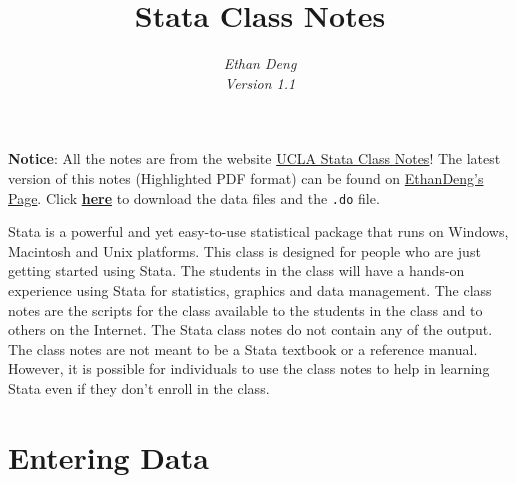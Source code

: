 \documentclass{article}
\title{\bfseries{\color{blue}Stata} {\color{magenta}Class Notes}}
\author{\Large\gara\itshape{{\color{blue}E}than {\color{magenta}D}eng} \\ Version 1.1}
\begin{document}
\maketitle
\noindent\textbf{Notice}: All the notes are from the website \href{http://www.ats.ucla.edu/stat/stata/notes/default13.htm}{UCLA Stata Class Notes}! The latest version of this notes (Highlighted PDF format) can be found on \href{http://ddswhu.com/}{EthanDeng\rq{}s Page}. Click \href{http://stack.ddswhu.com/Stata/Stata_class_notes/data.zip}{\textbf{here}} to download the data files and the \lstinline{.do} file.

Stata is a powerful and yet easy-to-use statistical package that runs on Windows, Macintosh and Unix platforms.  This class is designed for people who are just getting started using Stata.  The students in the class will have a hands-on experience using Stata for statistics, graphics and data management.  The class notes are the scripts for the class available to the students in the class and to others on the Internet.  The Stata class notes do not contain any of the output.  The class notes are not meant to be a Stata textbook or a reference manual.  However, it is possible for individuals to use the class notes to help in learning Stata even if they don't enroll in the class.

\section{Entering Data}
\end{document}
